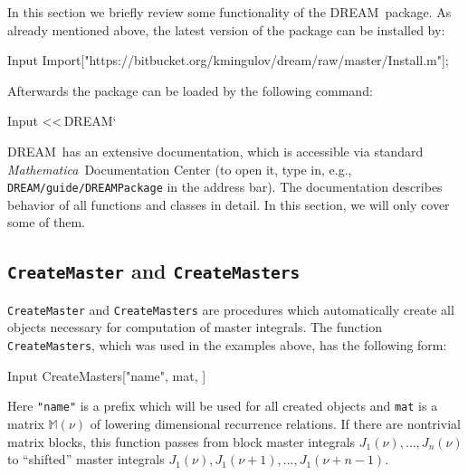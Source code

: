 \documentclass[sort&compress]{elsarticle}
\newcommand{\Mathematica}{\textit{Mathematica}}
\begin{document}
\mmaResetCellIndex

In this section we briefly review some functionality of the DREAM\ package.
As already mentioned above, the latest version of the package can be installed by:
\begin{mmaCell}{Input}
	Import["https://bitbucket.org/kmingulov/dream/raw/master/Install.m"];
\end{mmaCell}
Afterwards the package can be loaded by the following command:
\begin{mmaCell}[moredefined={DREAM}]{Input}
	<<\,DREAM`
\end{mmaCell}
DREAM\ has an extensive documentation, which is accessible via standard \Mathematica\ Documentation Center (to open it, type in, e.g., \texttt{DREAM/guide/DREAMPackage} in the address bar).
The documentation describes behavior of all functions and classes in detail.
In this section, we will only cover some of them. 

\subsection{\texttt{CreateMaster} and \texttt{CreateMasters}}

\texttt{CreateMaster} and \texttt{CreateMasters} are procedures which automatically create all objects necessary for computation of master integrals.
The function \texttt{CreateMasters}, which was used in the examples above, has the following form:
\begin{mmaCell}[moredefined={CreateMasters}]{Input}
	CreateMasters["name", mat, \mmaUnd{\(\nu\)}]
\end{mmaCell}
Here \texttt{"name"} is a prefix which will be used for all created objects and \texttt{mat} is a matrix $\mathbb{M}(\nu)$ of lowering dimensional recurrence relations.
If there are nontrivial matrix blocks, this function passes from block master integrals $J_1(\nu), \ldots, J_n(\nu)$ to ``shifted'' master integrals $J_1(\nu), J_1(\nu+1), \ldots, J_1(\nu+n-1)$.
\end{document}
